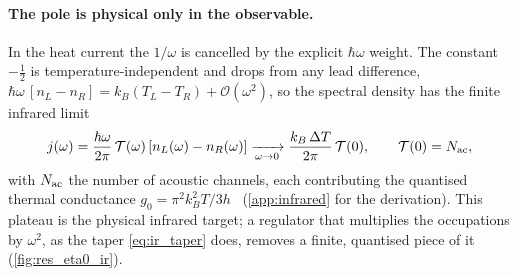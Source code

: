 \paragraph{The pole is physical only in the observable.}
In the heat current the $1/\omega$ is cancelled by the explicit $\hbar\omega$
weight. The constant $-\tfrac12$ is temperature-independent and drops from any lead
difference, $\hbar\omega\,[n_L-n_R]=k_B(T_L-T_R)+\mathcal{O}(\omega^2)$, so the
spectral density has the finite infrared limit
\begin{equation}\label{eq:ir_plateau}
  j(\omega)=\frac{\hbar\omega}{2\pi}\,\mathcal{T}(\omega)\,[n_L(\omega)-n_R(\omega)]
  \xrightarrow[\omega\to0]{}\frac{k_B\,\Delta T}{2\pi}\,\mathcal{T}(0),
  \qquad \mathcal{T}(0)=N_{\rm ac},
\end{equation}
with $N_{\rm ac}$ the number of acoustic channels, each contributing the quantised
thermal conductance $g_0=\pi^2k_B^2T/3h$~\cite{rego_quantized_1998,schwab_measurement_2000,jeong_analysis_2012}
(\cref{app:infrared} for the derivation). This plateau is the physical infrared
target; a regulator that multiplies the occupations by $\omega^2$, as the taper
\cref{eq:ir_taper} does, removes a finite, quantised piece of it
(\cref{fig:res_eta0_ir}).

